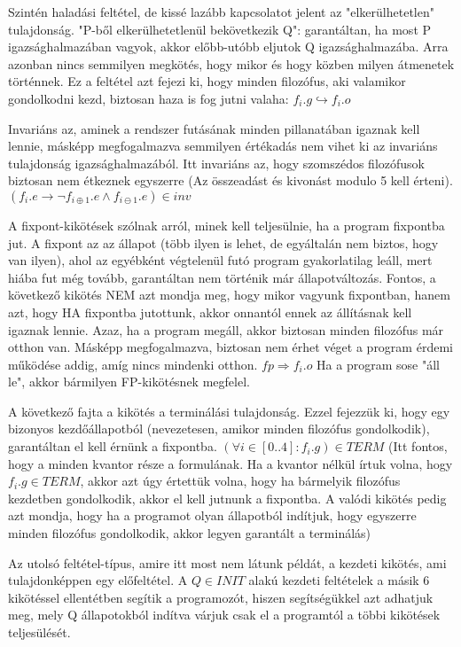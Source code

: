 \documentclass{article}
\begin{document}
Szintén haladási feltétel, de kissé lazább kapcsolatot jelent az "elkerülhetetlen" tulajdonság. "P-ből elkerülhetetlenül bekövetkezik Q": garantáltan, ha most P igazsághalmazában vagyok, akkor előbb-utóbb eljutok Q igazsághalmazába. Arra azonban nincs semmilyen megkötés, hogy mikor és hogy közben milyen átmenetek történnek. Ez a feltétel azt fejezi ki, hogy minden filozófus, aki valamikor gondolkodni kezd, biztosan haza is fog jutni valaha: $f_i.g \hookrightarrow f_i.o$

Invariáns az, aminek a rendszer futásának minden pillanatában igaznak kell lennie, másképp megfogalmazva semmilyen értékadás nem vihet ki az invariáns tulajdonság igazsághalmazából. Itt invariáns az, hogy szomszédos filozófusok biztosan nem étkeznek egyszerre (Az összeadást és kivonást modulo 5 kell érteni).
$(f_i.e \rightarrow \neg f_{i\oplus1}.e \land f_{i\ominus1}.e) \in inv$

A fixpont-kikötések szólnak arról, minek kell teljesülnie, ha a program fixpontba jut. A fixpont az az állapot (több ilyen is lehet, de egyáltalán nem biztos, hogy van ilyen), ahol az egyébként végtelenül futó program gyakorlatilag leáll, mert hiába fut még tovább, garantáltan nem történik már állapotváltozás. Fontos, a következő kikötés NEM azt mondja meg, hogy mikor vagyunk fixpontban, hanem azt, hogy HA fixpontba jutottunk, akkor onnantól ennek az állításnak kell igaznak lennie. Azaz, ha a program megáll, akkor biztosan minden filozófus már otthon van. Másképp megfogalmazva, biztosan nem érhet véget a program érdemi működése addig, amíg nincs mindenki otthon. $fp \Rightarrow f_i.o$ Ha a program sose "áll le", akkor bármilyen FP-kikötésnek megfelel.

A következő fajta a kikötés a terminálási tulajdonság. Ezzel fejezzük ki, hogy egy bizonyos kezdőállapotból (nevezetesen, amikor minden filozófus gondolkodik), garantáltan el kell érnünk a fixpontba. $(\forall i \in [0..4] : f_i.g) \in TERM$ (Itt fontos, hogy a minden kvantor része a formulának. Ha a kvantor nélkül írtuk volna, hogy $f_i.g \in TERM $, akkor azt úgy értettük volna, hogy ha bármelyik filozófus kezdetben gondolkodik, akkor el kell jutnunk a fixpontba. A valódi kikötés pedig azt mondja, hogy ha a programot olyan állapotból indítjuk, hogy egyszerre minden filozófus gondolkodik, akkor legyen garantált a terminálás)

Az utolsó feltétel-típus, amire itt most nem látunk példát, a kezdeti kikötés, ami tulajdonképpen egy   előfeltétel. A $Q \in INIT$ alakú kezdeti feltételek a másik 6 kikötéssel ellentétben segítik a programozót, hiszen segítségükkel azt adhatjuk meg, mely Q állapotokból indítva várjuk csak el a programtól a többi kikötések teljesülését.
\end{document}
